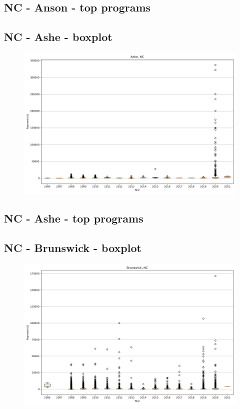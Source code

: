 \subsection*{NC - Anson - top programs}

\newpage
\subsection*{NC - Ashe - boxplot}
\begin{figure}[h]
\centering
\includegraphics[width=7in]{../output/boxplots/counties/Ashe-NC_boxplot.png}
\end{figure}


\subsection*{NC - Ashe - top programs}

\newpage
\subsection*{NC - Brunswick - boxplot}
\begin{figure}[h]
\centering
\includegraphics[width=7in]{../output/boxplots/counties/Brunswick-NC_boxplot.png}
\end{figure}


